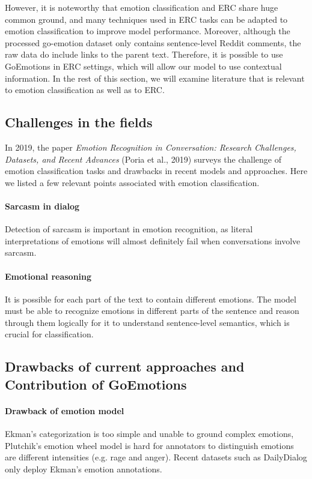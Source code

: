 \documentclass{article}
\begin{document}
However, it is noteworthy that emotion classification and ERC share huge common ground, and many techniques used in ERC tasks can be adapted to emotion classification to improve model performance. Moreover, although the processed go-emotion dataset only contains sentence-level Reddit comments, the raw data do include links to the parent text. Therefore, it is possible to use GoEmotions in ERC settings, which will allow our model to use contextual information. In the rest of this section, we will examine literature that is relevant to emotion classification as well as to ERC. 

\subsection{Challenges in the fields}

In 2019, the paper \textit{Emotion Recognition in Conversation: Research Challenges, Datasets, and Recent Advances}\cite{survey2019} (Poria et al., 2019) surveys the challenge of emotion classification tasks and drawbacks in recent models and approaches. Here we listed a few relevant points associated with emotion classification. 

\paragraph{Sarcasm in dialog} Detection of sarcasm is important in emotion recognition, as literal interpretations of emotions will almost definitely fail when conversations involve sarcasm. 

\paragraph{Emotional reasoning} It is possible for each part of the text to contain different emotions. The model must be able to recognize emotions in different parts of the sentence and reason through them logically for it to understand sentence-level semantics, which is crucial for classification. 

\subsection{Drawbacks of current approaches and Contribution of GoEmotions}
\paragraph{Drawback of emotion model} Ekman's categorization is too simple and unable to ground complex emotions, Plutchik's emotion wheel model is hard for annotators to distinguish emotions are different intensities (e.g. rage and anger). Recent datasets such as DailyDialog only deploy Ekman's emotion annotations.
\end{document}
